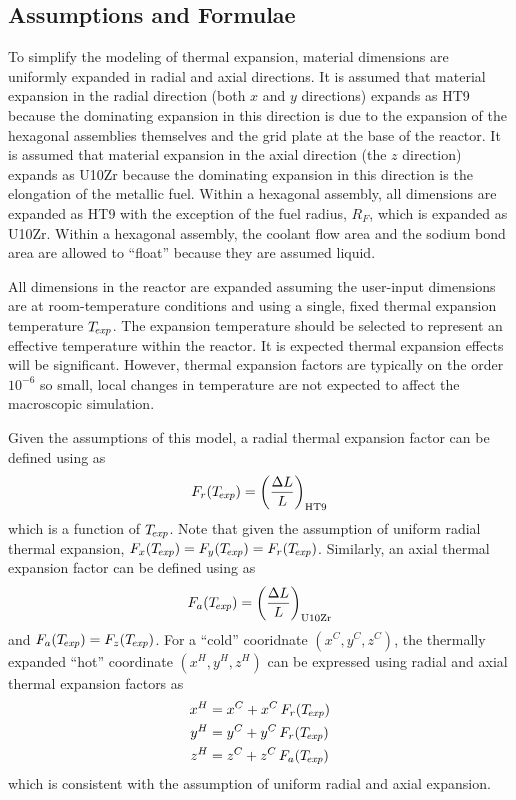   \subsection{Assumptions and Formulae}
  \label{sec:model_details__assumptions_and_formulae}
    To simplify the modeling of thermal expansion, material dimensions are
    uniformly expanded in radial and axial directions. It is assumed that 
    material expansion in the radial direction (both $x$ and $y$ directions) 
    expands as HT9 because the dominating expansion in this direction is due to 
    the expansion of the hexagonal assemblies themselves and the grid plate at
    the base of the reactor. It is assumed that
    material expansion in the axial direction (the $z$ direction) expands as 
    U10Zr because the dominating expansion in this direction is the elongation 
    of the metallic fuel. Within a hexagonal assembly, all dimensions are 
    expanded as HT9 with the exception of the fuel radius, $R_F$, which is 
    expanded as U10Zr. Within a hexagonal assembly, the coolant flow area and 
    the sodium bond area are allowed to ``float'' because they are assumed 
    liquid.
    
    All dimensions in the reactor are expanded assuming the user-input 
    dimensions are at room-temperature conditions and using a single, fixed 
    thermal expansion temperature $T_{\!\mbox{\scriptsize \em exp}}$. The expansion temperature should be 
    selected to represent an effective temperature within the reactor. It is 
    expected thermal expansion effects will be significant. However, thermal 
    expansion factors are typically on the order $10^{-6}$ so small, local 
    changes in temperature are not expected to affect the macroscopic 
    simulation.

    Given the assumptions of this model, a radial thermal expansion factor can 
    be defined using  as
    \begin{equation}
      \label{eq:lef_r}
      F_r(T_{\!\mbox{\scriptsize \em exp}}) = \left(\frac{\Delta L}{L}\right)_{\text{HT9}}
    \end{equation}
    which is a function of $T_{\!\mbox{\scriptsize \em exp}}$. Note that given the assumption of uniform
    radial thermal expansion, ${F_x(T_{\!\mbox{\scriptsize \em exp}}) = F_y(T_{\!\mbox{\scriptsize \em exp}}) = F_r(T_{\!\mbox{\scriptsize \em exp}})}$.
    Similarly, an axial thermal expansion factor can be defined using
     as 
    \begin{equation}
      \label{eq:lef_a}
      F_a(T_{\!\mbox{\scriptsize \em exp}}) = \left(\frac{\Delta L}{L}\right)_{\text{U10Zr}}
    \end{equation}
    and $F_a(T_{\!\mbox{\scriptsize \em exp}}) = F_z(T_{\!\mbox{\scriptsize \em exp}})$. For a ``cold'' cooridnate 
    $(x^C,y^C,z^C)$, the thermally expanded ``hot'' coordinate $(x^H,y^H,z^H)$ 
    can be expressed using radial and axial thermal expansion factors as
    \begin{align}
      \label{eq:expand_x}
      x^H &= x^C + x^C \, F_r(T_{\!\mbox{\scriptsize \em exp}}) \\
      \label{eq:expand_y}
      y^H &= y^C + y^C \, F_r(T_{\!\mbox{\scriptsize \em exp}}) \\
      \label{eq:expand_z}
      z^H &= z^C + z^C \, F_a(T_{\!\mbox{\scriptsize \em exp}})
    \end{align}
    which is consistent with the assumption of uniform radial and axial 
    expansion.

